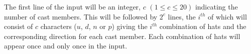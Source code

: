 The first line of the input will be an integer, $c$ $(1 \le c \le 20)$ indicating the number of cast members. This will be followed by $2^c$ lines, the $i^{th}$ of which will consist of $c$ characters ($u$, $d$, $n$ or $p$) giving the $i^{th}$ combination of hats and the corresponding direction for each cast member. Each combination of hats will appear once and only once in the input.

